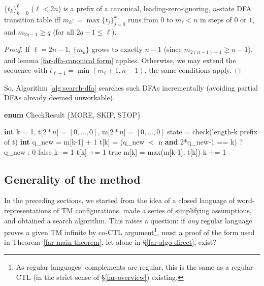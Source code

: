 \begin{corollary}
  $\{t_k\}_{k=0}^\ell$ ($\ell<2n$) is a prefix of a canonical, leading-zero-ignoring, $n$-state DFA transition table iff
  $m_k \mathrel{\mathop:}= \max\{t_j\}_{j=0}^k$ runs from $0$ to $m_\ell<n$ in steps of $0$ or $1$, and $m_{2q-1}\ge q$ (for all $2q - 1 \le \ell$).
\end{corollary}
\begin{proof}
  If $\ell=2n-1$, $\{m_k\}$ grows to exactly $n-1$ (since $m_{2(n-1)-1}\ge n-1$), and lemma \ref{far-dfa-canonical form} applies.
  Otherwise, we may extend the sequence with $t_{\ell+1}=\min(m_\ell+1,n-1)$, the same conditions apply.
\end{proof}

So, Algorithm \ref{alg:search-dfa} searches such DFAs incrementally (avoiding partial DFAs already deemed unworkable).

\begin{algorithm}
  \caption{{\sc search-dfa}}\label{alg:search-dfa}

  \begin{algorithmic}[1]
    \State \textbf{enum} CheckResult \{MORE, SKIP, STOP\}
    \Statex

    \State \textbf{int} k = 1, t[$2*n$] = $[0,\ldots,0]$, m[$2*n$] = $[0,\ldots,0]$
    \Loop
    \State state = check(length-k prefix of t)
    \State \textbf{int} q\_new = m[k-1] + 1
    \State t[k] = (q\_new $<$ \textrm{n} \textbf{and} 2*q\_new-1 == k) ? q\_new : 0
    \Repeat
    \Return false
    \EndIf
    \State k -= 1
    \State t[k] += 1
    \Else\;\Return true
    \EndIf
    \State m[k] = max(m[k-1], t[k])
    \State k += 1
    \EndLoop
    \EndProcedure

  \end{algorithmic}
\end{algorithm}


\subsection{Generality of the method}
In the preceding sections, we started from the idea of a closed language of word-representations of TM configurations, made a series of simplifying assumptions, and obtained a search algorithm.
This raises a question: if \emph{any} regular language proves a given TM infinite by co-CTL argument\footnote{
  As regular languages' complements are regular, this is the same as a regular CTL (in the strict sense of \S\ref{far-overview}) existing.
},
must a proof of the form used in Theorem~\ref{far-main-theorem}, let alone in \S\ref{far-algo-direct}, exist?

